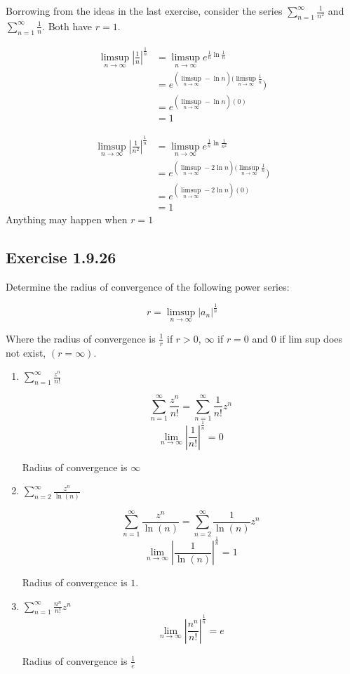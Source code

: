 \documentclass{tufte-book}
\theoremstyle{mytheoremstyle}
\theoremstyle{mylemstyle}
\theoremstyle{mydefstyle}
\begin{document}
Borrowing from the ideas in the last exercise, consider the series $\sum_{n=1}^{\infty} \frac{1}{n^2}$ and $\sum_{n=1}^{\infty} \frac{1}{n}$.  Both have $r = 1$.

\begin{align*}
\limsup_{n \to \infty}|\frac{1}{n}|^{\frac{1}{n}} &= \limsup_{n \to \infty}e^{\frac{1}{n} \ln \frac{1}{n}} \\
&= e^{(\limsup_{n \to \infty} -\ln n)(\limsup_{n \to \infty}\frac{1}{n}})\\
&= e^{(\limsup_{n \to \infty} -\ln n)(0)}\\
&= 1
\end{align*}

\begin{align*}
\limsup_{n \to \infty}|\frac{1}{n^2}|^{\frac{1}{n}} &= \limsup_{n \to \infty}e^{\frac{1}{n} \ln \frac{1}{n^2}} \\
&= e^{(\limsup_{n \to \infty} -2\ln n)(\limsup_{n \to \infty}\frac{1}{n}})\\
&= e^{(\limsup_{n \to \infty} -2\ln n)(0)}\\
&= 1
\end{align*}
Anything may happen when $r = 1$

\subsection{Exercise 1.9.26}
Determine the radius of convergence of the following power series:

\[ r = \limsup_{n \to \infty}|a_n|^{\frac{1}{n}} \]

Where the radius of convergence is $\frac{1}{r}$ if $r > 0$, $\infty$ if $r = 0$ and $0$ if lim sup does not exist, $(r = \infty)$.

\begin{enumerate}

\item $\sum_{n=1}^{\infty}\frac{z^n}{n!}$

\[ \sum_{n=1}^{\infty}\frac{z^n}{n!} = \sum_{n=1}^{\infty}\frac{1}{n!}z^n \]
\[ \lim_{n \to \infty}|\frac{1}{n!}|^{\frac{1}{n}} = 0 \]

Radius of convergence is $\infty$

\item $\sum_{n=2}^{\infty}\frac{z^n}{\ln(n)}$

\[ \sum_{n=1}^{\infty}\frac{z^n}{\ln(n)} = \sum_{n=2}^{\infty}\frac{1}{\ln(n)}z^n \]
\[ \lim_{n \to \infty}|\frac{1}{\ln(n)}|^{\frac{1}{n}} = 1 \]

Radius of convergence is $1$.

\item $\sum_{n=1}^{\infty}\frac{n^n}{n!}z^n$
\[ \lim_{n \to \infty}|\frac{n^n}{n!}|^{\frac{1}{n}} = e \]

Radius of convergence is $\frac{1}{e}$
\end{enumerate}
\end{document}
